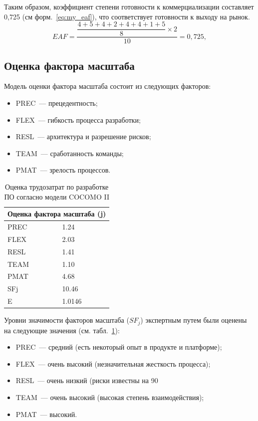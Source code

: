 Таким образом, коэффициент степени готовности к коммерциализации составляет 0,725 (см форм.~\ref{eq:my_eaf}), что соответствует готовности к выходу на рынок.
\begin{equation}\label{eq:my_eaf}
	EAF = \dfrac{\dfrac{4 + 5 + 4 + 2 + 4 + 4 + 1 + 5}{8} \times 2}{10} = 0{,}725,
\end{equation}

\subsection{Оценка фактора масштаба}

Модель оценки фактора масштаба состоит из следующих факторов:
\begin{itemize}
	\item PREC~--– прецедентность;
	\item FLEX~--– гибкость процесса разработки;
	\item RESL~--– архитектура и разрешение рисков;
	\item TEAM~--– сработанность команды;
	\item PMAT~--– зрелость процессов.
\end{itemize}

\begin{table}[htb]
	\caption{Оценка трудозатрат по разработке ПО согласно модели COCOMO II}
	\centering
	
	\emergencystretch=10pt
	\begin{tabular}{@{}ll@{}}
		\toprule
		\multicolumn{2}{c}{\textbf{Оценка фактора масштаба (j)}} \\
		\midrule
		PREC & 1.24 \\
		FLEX & 2.03 \\
		RESL & 1.41 \\
		TEAM & 1.10 \\
		PMAT & 4.68 \\
		SFj  & 10.46 \\
		E    & 1.0146 \\
		\bottomrule
	\end{tabular}
	\label{tab:labor_costs_cocomo}
\end{table}

Уровни значимости факторов масштаба ($SF_j$) экспертным путем были оценены на следующие значения (см. табл.~\ref{tab:labor_costs_cocomo}):
\begin{itemize}
	\item PREC~--- средний (есть некоторый опыт в продукте и платформе);
	\item FLEX~--- очень высокий (незначительная жесткость процесса);
	\item RESL~--- очень низкий (риски известны на 90%
	\item TEAM~--- очень высокий (высокая степень взаимодействия);
	\item PMAT~--- высокий.
\end{itemize}

